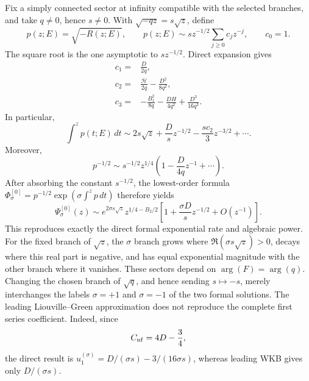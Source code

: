 \documentclass[11pt]{article}
\theoremstyle{remark}
\begin{document}
Fix a simply connected sector at infinity compatible with the selected
branches, and take \(q\ne0\), hence \(s\ne0\).  With
\(\sqrt{-qz}=s\sqrt z\), define
\begin{equation}
 p(z;E)=\sqrt{-R(z;E)},\qquad
 p(z;E)\sim sz^{-1/2}\sum_{j\geq0}c_jz^{-j},\qquad c_0=1.
 \label{eq:lg-momentum}
\end{equation}
The square root is the one asymptotic to \(sz^{-1/2}\).  Direct expansion
gives
\begin{align}
 c_1={}&\frac{D}{2q},\nonumber\\
 c_2={}&\frac{\mathcal{H}}{2q}-\frac{D^2}{8q^2},\nonumber\\
 c_3={}&-\frac{B_1^2}{8q}-\frac{DH}{4q^2}
          +\frac{D^3}{16q^3}.
 \label{eq:lg-momentum-coefficients}
\end{align}
In particular,
\begin{equation}
 \int^z p(t;E)\,dt
 \sim 2s\sqrt z+\frac{D}{s}z^{-1/2}
 -\frac{s c_2}{3}z^{-3/2}+\cdots.
 \label{eq:lg-phase}
\end{equation}
Moreover,
\begin{equation}
 p^{-1/2}\sim s^{-1/2}z^{1/4}
 \left(1-\frac{D}{4q}z^{-1}+\cdots\right).
 \label{eq:lg-phase-prefactor}
\end{equation}
After absorbing the constant \(s^{-1/2}\), the lowest-order formula
\(\Phi_\sigma^{[0]}=p^{-1/2}\exp(\sigma\int^z p\,dt)\) therefore yields
\begin{equation}
 \Psi_\sigma^{[0]}(z)\sim
 e^{2\sigma s\sqrt z}z^{1/4-B_2/2}
 \left[1+\frac{\sigma D}{s}z^{-1/2}+O(z^{-1})\right].
 \label{eq:lg-leading-psi}
\end{equation}
This reproduces exactly the direct formal exponential rate and algebraic power.
For the fixed branch of \(\sqrt z\), the \(\sigma\) branch grows where
\(\Re(\sigma s\sqrt z)>0\), decays where this real part is negative, and has
equal exponential magnitude with the other branch where it vanishes.  These
sectors depend on \(\arg(F)=\arg(q)\).  Changing the chosen branch of
\(\sqrt q\), and hence sending \(s\mapsto-s\), merely interchanges the labels
\(\sigma=+1\) and \(\sigma=-1\) of the two formal solutions.
The leading Liouville--Green approximation does not reproduce the complete
first series coefficient.  Indeed, since
\begin{equation}
 C_{\rm nf}=4D-\frac34,
 \end{equation}
the direct result is
\(u_1^{(\sigma)}=D/(\sigma s)-3/(16\sigma s)\), whereas leading WKB gives
only \(D/(\sigma s)\).
\end{document}

